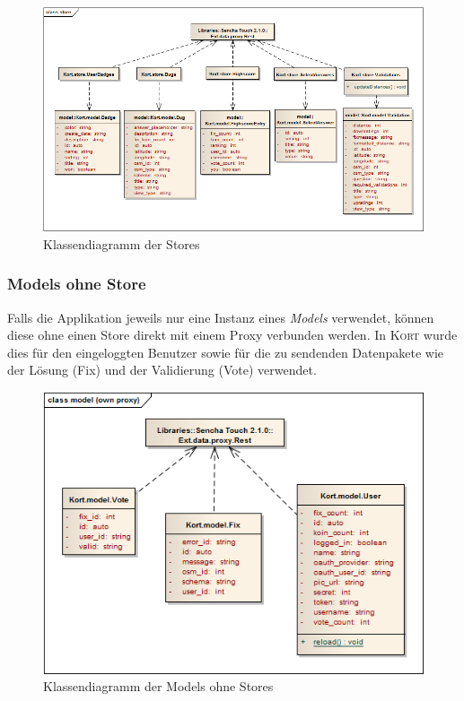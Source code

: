 \begin{figure}[H]
	\centering
	\includegraphics[width=\textwidth]{images/uml/kort-classdiagram-store}
	\caption{Klassendiagramm der Stores}
	\label{image-kort-classdiagram-store}
\end{figure}

\subsubsection{Models ohne Store}

Falls die Applikation jeweils nur eine Instanz eines \emph{Models} verwendet, können diese ohne einen Store direkt mit einem Proxy verbunden werden.
In \textsc{Kort} wurde dies für den eingeloggten Benutzer sowie für die zu sendenden Datenpakete wie der Lösung (Fix) und der Validierung (Vote) verwendet.

\begin{figure}[H]
	\centering
	\includegraphics[scale=0.6]{images/uml/kort-classdiagram-model_own_proxy}
	\caption{Klassendiagramm der Models ohne Stores}
	\label{image-kort-classdiagram-model_own_proxy}
\end{figure}

